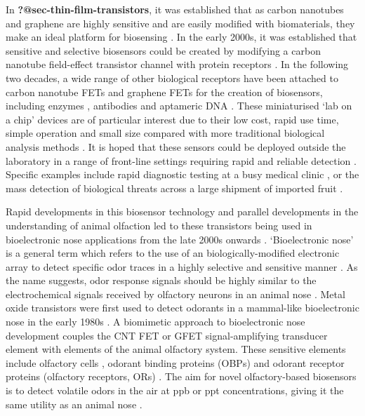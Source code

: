 \documentclass[
  a4paper,
]{scrbook}
\begin{document}
In \textbf{?@sec-thin-film-transistors}, it was established that as
carbon nanotubes and graphene are highly sensitive and are easily
modified with biomaterials, they make an ideal platform for biosensing
\autocite{Kauffman2008,Ohno2010}. In the early 2000s, it was established
that sensitive and selective biosensors could be created by modifying a
carbon nanotube field-effect transistor channel with protein receptors
\autocite{Chen2003,Kauffman2008}. In the following two decades, a wide
range of other biological receptors have been attached to carbon
nanotube FETs and graphene FETs for the creation of biosensors,
including enzymes \autocite{Lee2009,Zhang2015a,Dudina2019}, antibodies
\autocite{Kim2008,Jin2015,Tsang2019} and aptameric DNA
\autocite{Maehashi2007,Gao2016,Nguyen2021}. These miniaturised `lab on a
chip' devices are of particular interest due to their low cost, rapid
use time, simple operation and small size compared with more traditional
biological analysis methods \autocite{Kauffman2008}. It is hoped that
these sensors could be deployed outside the laboratory in a range of
front-line settings requiring rapid and reliable detection
\autocite{Dung2018}. Specific examples include rapid diagnostic testing
at a busy medical clinic \autocite{Lim2014}, or the mass detection of
biological threats across a large shipment of imported fruit
\autocite{B3,Queensland}.

Rapid developments in this biosensor technology and parallel
developments in the understanding of animal olfaction led to these
transistors being used in bioelectronic nose applications from the late
2000s onwards \autocite{Yoon2009,Jin2012,Lee2012b,Park2012}.
`Bioelectronic nose' is a general term which refers to the use of an
biologically-modified electronic array to detect specific odor traces in
a highly selective and sensitive manner \autocite{Dung2018}. As the name
suggests, odor response signals should be highly similar to the
electrochemical signals received by olfactory neurons in an animal nose
\autocite{Dung2018}. Metal oxide transistors were first used to detect
odorants in a mammal-like bioelectronic nose in the early 1980s
\autocite{Persaud1982}. A biomimetic approach to bioelectronic nose
development couples the CNT FET or GFET signal-amplifying transducer
element with elements of the animal olfactory system. These sensitive
elements include olfactory cells \autocite{Wang2007}, odorant binding
proteins (OBPs) \autocite{Larisika2015,Kotlowski2018} and odorant
receptor proteins (olfactory receptors, ORs)
\autocite{Yang2018,Murugathas2020}. The aim for novel olfactory-based
biosensors is to detect volatile odors in the air at ppb or ppt
concentrations, giving it the same utility as an animal nose
\autocite{Dung2018}.
\end{document}
